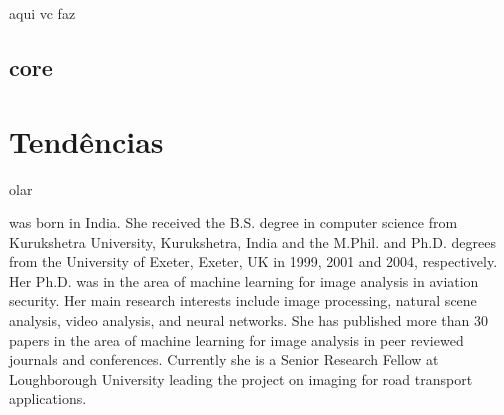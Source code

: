 \documentclass{classe_cn}                 %
\begin{document}
aqui vc faz

\subsection{core}

\section{Tendências}

olar



\vspace{1.0cm}
 was born in India. She received the B.S. 
degree in computer science from Kurukshetra University, Kurukshetra, 
India and the M.Phil. and Ph.D. degrees from the University of Exeter, 
Exeter, UK in 1999, 2001 and 2004, respectively. Her Ph.D. was in the 
area of machine learning for image analysis in aviation security. Her 
main research interests include image processing, natural scene analysis,
video analysis, and neural networks. She has published more than 30 papers
in the area of machine learning for image analysis in peer reviewed 
journals and conferences. Currently she is a Senior Research Fellow at
Loughborough University leading the project on imaging for road transport
applications.
\end{document}
